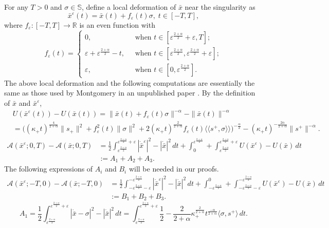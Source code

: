 \documentclass[11pt]{amsart}
\newcommand{\rr}{\mathbb R}
\newcommand{\A}{\mathcal A}
\newcommand{\bs}{\mathbb S}
\newcommand{\al}{\alpha}
\newcommand{\ep}{\varepsilon}
\newcommand{\sg}{\sigma}
\newcommand{\kp}{\kappa}
\newcommand{\ey}{\frac{1}{2}}
\newcommand{\pwa}{\frac{2}{2+\al}}
\newcommand{\pwb}{\frac{2 +\al}{2}}
\newcommand{\xb}{\bar{x}}
\def\me#1{\langle\!\langle #1 \rangle\!\rangle}
\theoremstyle{plain}
\theoremstyle{definition}
\theoremstyle{remark}
\begin{document}
 
For any $T>0$ and $\sg \in \bs$,  define a local deformation of $\xb$ near the singularity as
\begin{equation}
\label{eq;xb-ep} \xb^{\ep}(t) = \xb(t) + f_{\ep}(t) \sg, \; t \in [-T, T],
\end{equation}
where $f_{\ep}: [-T, T] \to \rr$ is an even function with 
\begin{equation}
\label{eq;f-ep} f_{\ep}(t) = \begin{cases}
0, \; & \text{ when } t \in [\ep^{\frac{2 +\al}{2}}+ \ep, T]; \\
\ep + \ep^{\frac{2 +\al}{2}} -t, \; & \text{ when } t \in [\ep^{\frac{2 +\al}{2}}, \ep^{\frac{2 +\al}{2}}+ \ep]; \\
\ep, \; & \text{ when } t \in [0, \ep^{\frac{2 +\al}{2}}].
\end{cases}
\end{equation} 
The above local deformation and the following computations are essentially the same as those used by Montgomery in an unpublished paper \cite{Mont99a}. By the definition of $\xb$ and $\xb^{\ep}$,
$$
 \begin{aligned}
& U(\xb^{\ep}(t))  - U(\xb(t))  =  \|\xb(t) + f_{\ep}(t) \sg \|^{-\al} - \|\xb(t)\|^{-\al} \\ 
& = \Big( (\kp_+ t)^{\frac{4}{2 +\al}} \|s_+\|^2 + f_{\ep}^2(t) \|\sg\|^2 + 2 (\kp_+ t)^{\pwa} f_{\ep}(t) \me{s^+, \sg}  \Big)^{-\frac{\al}{2}} - (\kp_+ t)^{-\frac{2\al}{2 +\al}} \|s^+\|^{-\al}.
\end{aligned}
$$
$$ \begin{aligned}
\A(\xb^{\ep}; 0, T) - \A(\xb; 0, T) & = \ey \int_{\ep^{\pwb}}^{\ep^{\pwb}+ \ep} |\dot{\xb}^{\ep}|^2 - |\dot{\xb}|^2 \,dt + \int_{0}^{\ep^{\pwb}}+ \int_{\ep^{\pwb}}^{\ep^{\pwb}+\ep}  U(\xb^{\ep}) - U(\xb) \,dt \\
& := A_1 + A_2 + A_3.
\end{aligned}
$$
The following expressions of $A_i$ and $B_i$ will be needed in our proofs. 
\begin{equation*}
\begin{aligned}
\A(\xb^{\ep}; -T, 0) - \A(\xb; -T, 0) & =  \ey \int^{-\ep^{\pwb}}_{-\ep^{\pwb}-\ep} |\dot{\xb}^{\ep}|^2 - |\dot{\xb}|^2 \,dt + \int^{0}_{-\ep^{\pwb}}+ \int^{-\ep^{\pwb}}_{-\ep^{\pwb}-\ep}  U(\xb^{\ep}) - U(\xb) \,dt \\
& := B_1 + B_2 + B_3.
\end{aligned}
\end{equation*}
\begin{equation}
\label{eq;A1}A_1  = \ey \int_{\ep^{\pwb}}^{\ep^{\pwb}+\ep} |\dot{\xb} - \sg|^2 - |\dot{\xb}|^2 \,dt =  \int_{\ep^{\pwb}}^{\ep^{\pwb}+\ep}  \ey - \pwa \kp_+^{\pwa} t^{\frac{-\al}{2 +\al}} \langle \sg, s^+ \rangle \,dt. 
\end{equation}
\end{document}
